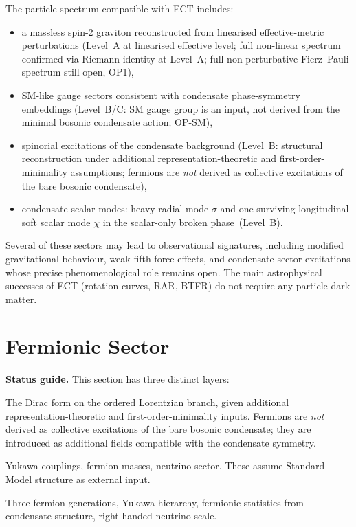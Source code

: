 \documentclass[11pt,a4paper]{article}
\numberwithin{equation}{section}
\begin{document}
The particle spectrum compatible with ECT includes:

\begin{itemize}
\item a massless spin-2 graviton reconstructed from linearised effective-metric
  perturbations (Level~A at linearised effective level; full non-linear
  spectrum confirmed via Riemann identity at Level~A; full non-perturbative
  Fierz--Pauli spectrum still open, OP1),
\item SM-like gauge sectors consistent with condensate phase-symmetry
      embeddings (Level~B/C: SM gauge group is an input, not derived
      from the minimal bosonic condensate action; OP-SM),
\item spinorial excitations of the condensate background
      (Level~B: structural reconstruction under additional
      representation-theoretic and first-order-minimality assumptions;
      fermions are \emph{not} derived as collective excitations of
      the bare bosonic condensate),
\item condensate scalar modes: heavy radial mode $\sigma$ and one surviving longitudinal soft scalar mode $\chi$ in the scalar-only broken phase~(Level~B).
\end{itemize}

Several of these sectors may lead to observational signatures,
including modified gravitational behaviour, weak fifth-force effects,
and condensate-sector excitations whose precise phenomenological role
remains open.
The main astrophysical successes of ECT (rotation curves, RAR, BTFR)
do not require any particle dark matter.

\section{Fermionic Sector}
\label{sec:fermions}

\textbf{Status guide.}
This section has three distinct layers:
\begin{description}[leftmargin=3em,style=unboxed,noitemsep]
  \item[Structural reconstruction (Level~B).]
    The Dirac form on the ordered Lorentzian branch, given additional
    representation-theoretic and first-order-minimality inputs.
    Fermions are \emph{not} derived as collective excitations of the bare
    bosonic condensate; they are introduced as additional fields
    compatible with the condensate symmetry.
  \item[Phenomenological embedding (Level~C).]
    Yukawa couplings, fermion masses, neutrino sector.
    These assume Standard-Model structure as external input.
  \item[Open problems.]
    Three fermion generations, Yukawa hierarchy, fermionic
    statistics from condensate structure, right-handed neutrino scale.
\end{description}
\end{document}
